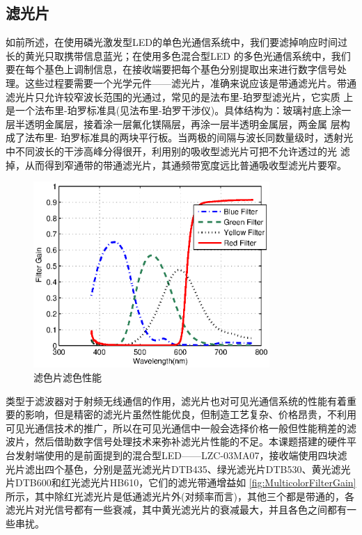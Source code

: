 \subsection{滤光片}
如前所述，在使用磷光激发型LED的单色光通信系统中，我们要滤掉响应时间过长的黄光只取携带信息蓝光；在使用多色混合型LED 的多色光通信系统中，我们要在每个基色上调制信息，在接收端要把每个基色分别提取出来进行数字信号处理。这些过程要需要一个光学元件——滤光片，准确来说应该是带通滤光片。带通滤光片只允许较窄波长范围的光通过，常见的是法布里-珀罗型滤光片，它实质 上是一个法布里-珀罗标准具(见法布里-珀罗干涉仪)。具体结构为：玻璃衬底上涂一层半透明金属层，接着涂一层氟化镁隔层，再涂一层半透明金属层，两金属 层构成了法布里- 珀罗标准具的两块平行板。当两极的间隔与波长同数量级时，透射光中不同波长的干涉高峰分得很开，利用别的吸收型滤光片可把不允许透过的光 滤掉，从而得到窄通带的带通滤光片，其通频带宽度远比普通吸收型滤光片要窄\cite{OpticalFilter}。
\begin{figure}[htbp]
    \centering
    \includegraphics[width=0.8\textwidth]{figures/chapter-2/MulticolorFilterGain.eps}
    \caption{滤色片滤色性能}
    \label{fig:MulticolorFilterGain}
\end{figure}
类型于滤波器对于射频无线通信的作用，滤光片也对可见光通信系统的性能有着重要的影响，但是精密的滤光片虽然性能优良，但制造工艺复杂、价格昂贵，不利用可见光通信技术的推广，所以在可见光通信中一般会选择价格一般但性能稍差的滤波片，然后借助数字信号处理技术来弥补滤光片性能的不足。本课题搭建的硬件平台发射端使用的是前面提到的混合型LED——LZC-03MA07，接收端使用四块滤光片滤出四个基色，分别是蓝光滤光片DTB435、绿光滤光片DTB530、黄光滤光片DTB600和红光滤光片HB610，它们的滤光带通增益如
\autoref{fig:MulticolorFilterGain}所示，其中除红光滤光片是低通滤光片外(对频率而言)，其他三个都是带通的，各滤光片对光信号都有一些衰减，其中黄光滤光片的衰减最大，并且各色之间都有一些串扰。
